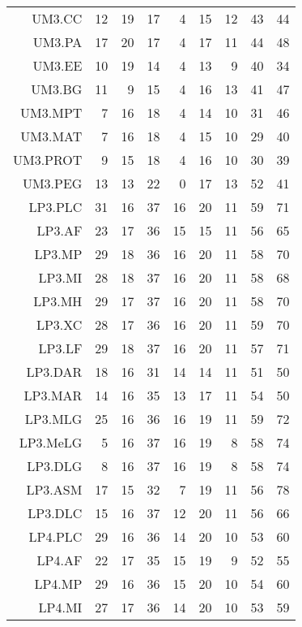 \begin{longtable}{rrrrrrrrr}
  UM3.CC &  12 &  19 &  17 &   4 &  15 &  12 &  43 &  44 \\ 
  UM3.PA &  17 &  20 &  17 &   4 &  17 &  11 &  44 &  48 \\ 
  UM3.EE &  10 &  19 &  14 &   4 &  13 &   9 &  40 &  34 \\ 
  UM3.BG &  11 &   9 &  15 &   4 &  16 &  13 &  41 &  47 \\ 
  UM3.MPT &   7 &  16 &  18 &   4 &  14 &  10 &  31 &  46 \\ 
  UM3.MAT &   7 &  16 &  18 &   4 &  15 &  10 &  29 &  40 \\ 
  UM3.PROT &   9 &  15 &  18 &   4 &  16 &  10 &  30 &  39 \\ 
  UM3.PEG &  13 &  13 &  22 &   0 &  17 &  13 &  52 &  41 \\ 
  LP3.PLC &  31 &  16 &  37 &  16 &  20 &  11 &  59 &  71 \\ 
  LP3.AF &  23 &  17 &  36 &  15 &  15 &  11 &  56 &  65 \\ 
  LP3.MP &  29 &  18 &  36 &  16 &  20 &  11 &  58 &  70 \\ 
  LP3.MI &  28 &  18 &  37 &  16 &  20 &  11 &  58 &  68 \\ 
  LP3.MH &  29 &  17 &  37 &  16 &  20 &  11 &  58 &  70 \\ 
  LP3.XC &  28 &  17 &  36 &  16 &  20 &  11 &  59 &  70 \\ 
  LP3.LF &  29 &  18 &  37 &  16 &  20 &  11 &  57 &  71 \\ 
  LP3.DAR &  18 &  16 &  31 &  14 &  14 &  11 &  51 &  50 \\ 
  LP3.MAR &  14 &  16 &  35 &  13 &  17 &  11 &  54 &  50 \\ 
  LP3.MLG &  25 &  16 &  36 &  16 &  19 &  11 &  59 &  72 \\ 
  LP3.MeLG &   5 &  16 &  37 &  16 &  19 &   8 &  58 &  74 \\ 
  LP3.DLG &   8 &  16 &  37 &  16 &  19 &   8 &  58 &  74 \\ 
  LP3.ASM &  17 &  15 &  32 &   7 &  19 &  11 &  56 &  78 \\ 
  LP3.DLC &  15 &  16 &  37 &  12 &  20 &  11 &  56 &  66 \\ 
  LP4.PLC &  29 &  16 &  36 &  14 &  20 &  10 &  53 &  60 \\ 
  LP4.AF &  22 &  17 &  35 &  15 &  19 &   9 &  52 &  55 \\ 
  LP4.MP &  29 &  16 &  36 &  15 &  20 &  10 &  54 &  60 \\ 
  LP4.MI &  27 &  17 &  36 &  14 &  20 &  10 &  53 &  59 \\ 

\end{longtable}
